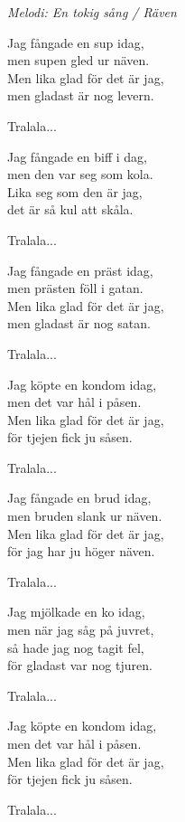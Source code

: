 {\footnotesize\textit{Melodi: En tokig sång / Räven}}\par
\vspace{10pt}
Jag fångade en sup idag,\\
men supen gled ur näven.\\
Men lika glad för det är jag,\\
men gladast är nog levern.\par
\vspace{10pt}
Tralala...\par
\vspace{10pt}
Jag fångade en biff i dag,\\
men den var seg som kola.\\
Lika seg som den är jag,\\
det är så kul att skåla.\par
\vspace{10pt}
Tralala...\par
\vspace{10pt}
Jag fångade en präst idag,\\
men prästen föll i gatan.\\
Men lika glad för det är jag,\\
men gladast är nog satan.\par
\vspace{10pt}
Tralala...\par
\vspace{10pt}
Jag köpte en kondom idag,\\
men det var hål i påsen.\\
Men lika glad för det är jag,\\
för tjejen fick ju såsen.\par
\vspace{10pt}
Tralala...\par
\vspace{10pt}
Jag fångade en brud idag,\\
men bruden slank ur näven.\\
Men lika glad för det är jag,\\
för jag har ju höger näven.\par
\vspace{10pt}
Tralala...\par
\vspace{10pt}
Jag mjölkade en ko idag,\\
men när jag såg på juvret,\\
så hade jag nog tagit fel,\\
för gladast var nog tjuren.\par
\vspace{10pt}
Tralala...\par
\vspace{10pt}
Jag köpte en kondom idag,\\
men det var hål i påsen.\\
Men lika glad för det är jag,\\
för tjejen fick ju såsen.\par
\vspace{10pt}
Tralala...
